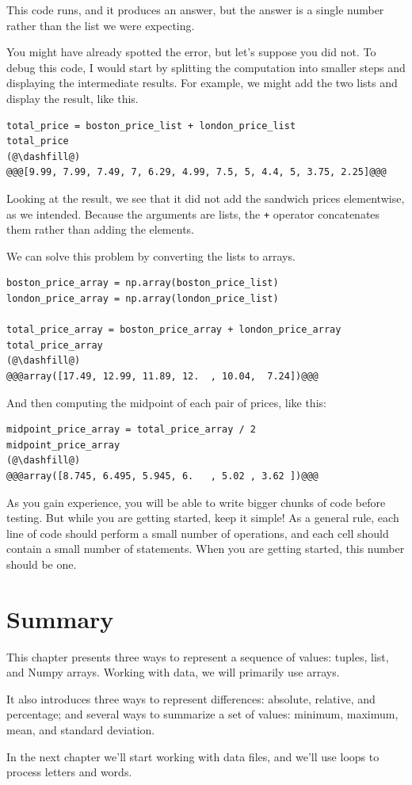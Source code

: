 This code runs, and it produces an answer, but the answer is a single
number rather than the list we were expecting.

You might have already spotted the error, but let's suppose you did not.
To debug this code, I would start by splitting the computation into
smaller steps and displaying the intermediate results. For example, we
might add the two lists and display the result, like this.

\begin{lstlisting}[]
total_price = boston_price_list + london_price_list
total_price
(@\dashfill@)
@@@[9.99, 7.99, 7.49, 7, 6.29, 4.99, 7.5, 5, 4.4, 5, 3.75, 2.25]@@@
\end{lstlisting}

Looking at the result, we see that it did not add the sandwich prices
elementwise, as we intended. Because the arguments are lists, the
\passthrough{\lstinline!+!} operator concatenates them rather than
adding the elements.

We can solve this problem by converting the lists to arrays.

\begin{lstlisting}[]
boston_price_array = np.array(boston_price_list)
london_price_array = np.array(london_price_list)

total_price_array = boston_price_array + london_price_array
total_price_array
(@\dashfill@)
@@@array([17.49, 12.99, 11.89, 12.  , 10.04,  7.24])@@@
\end{lstlisting}

And then computing the midpoint of each pair of prices, like this:

\begin{lstlisting}[]
midpoint_price_array = total_price_array / 2
midpoint_price_array
(@\dashfill@)
@@@array([8.745, 6.495, 5.945, 6.   , 5.02 , 3.62 ])@@@
\end{lstlisting}

As you gain experience, you will be able to write bigger chunks of code
before testing. But while you are getting started, keep it simple! As a
general rule, each line of code should perform a small number of
operations, and each cell should contain a small number of statements.
When you are getting started, this number should be one.

\hypertarget{summary}{%
\section{Summary}\label{summary}}

This chapter presents three ways to represent a sequence of values:
tuples, list, and Numpy arrays. Working with data, we will primarily use
arrays.

It also introduces three ways to represent differences: absolute,
relative, and percentage; and several ways to summarize a set of values:
minimum, maximum, mean, and standard deviation.

In the next chapter we'll start working with data files, and we'll use
loops to process letters and words.

